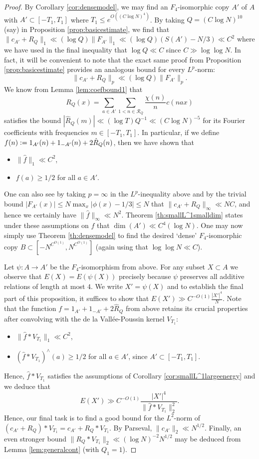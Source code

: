 \documentclass[11pt, reqno]{amsart}
\begin{document}
\begin{proof}
By Corollary \ref{cor:densemodel}, we may find an $F_4$-isomorphic copy $A'$ of $A$ with $A'\subset[-T_1,T_1]$ where $T_1\leqslant e^{O((C\log N)^4)}$. By taking $Q=(C\log N)^{10}$ (say) in Proposition \ref{prop:basicestimate}, we find that $\lVert c_{A'}+R_Q\rVert_1 \ll (\log Q)\lVert F_{A'}\rVert_1\ll (\log Q)(S(A')-N/3)\ll C^2$ where we have used in the final inequality that $\log Q\ll C$ since $C\gg \log \log N$. In fact, it will be convenient to note that the exact same proof from Proposition \ref{prop:basicestimate} provides an analogous bound for every $L^p$-norm:
$$\lVert c_{A'}+R_Q\rVert_p \ll (\log Q)\lVert F_{A'}\rVert_p.$$ We know from Lemma \ref{lem:coefbound1} that $$R_Q(x)=\sum_{a\in A'}\sum_{1<n\in \mathcal{R}_Q}\frac{\chi(n)}{n}c( nax)$$ satisfies the bound $|\hat{R}_Q(m)|\ll (\log T)Q^{-1}\ll (C\log N)^{-5}$ for its Fourier coefficients with frequencies $m\in [-T_1,T_1]$. In particular, if we define $f(n)\vcentcolon = 1_{A'}(n)+1_{-A'}(n)+2\hat{R}_Q(n)$, then we have shown that 
\begin{itemize}
    \item $\lVert \hat{f}\rVert_1 \ll C^2$,
    \item $f(a)\geqslant 1/2$ for all $a\in A'$. 
\end{itemize}
One can also see by taking $p=\infty$ in the $L^p$-inequality above and by the trivial bound $|F_{A'}(x)|\leqslant N\max_x |\phi(x)-1/3|\leqslant N$ that $\lVert c_{A'}+R_Q\rVert_\infty \ll N C$, and hence we certainly have $\lVert \hat{f}\rVert_\infty \ll N^2$. Theorem \ref{th:smallL^1smalldim} states under these assumptions on $f$ that $\dim(A')\ll C^4(\log N)$. One may now simply use Theorem \ref{th:densemodel} to find the desired `dense' $F_4$-isomorphic copy $B\subset [-N^{C^{O(1)}},N^{C^{O(1)}}]$ (again using that $\log \log N\ll C$).

\medskip

Let $\psi:A\to A'$ be the $F_4$-isomorphism from above. For any subset $X\subset A$ we observe that $E(X)=E(\psi(X))$ precisely because $\psi$ preserves all additive relations of length at most $4$. We write $X'=\psi(X)$ and to establish the final part of this proposition, it suffices to show that $E(X')\gg C^{-O(1)}\frac{|X'|^4}{N}$. Note that the function $f=1_{A'}+1_{-A'}+2\hat{R}_Q$ from above retains its crucial properties after convolving with the de la Vall\'ee-Poussin kernel $V_{T_1}$:
\begin{itemize}
    \item $\lVert \hat{f}*V_{T_1}\rVert_1\ll C^2$,
    \item $(\hat{f}*V_{T_1})^\wedge(a)\geqslant 1/2$ for all $a\in A'$, since $A'\subset[-T_1,T_1]$.
\end{itemize}
Hence, $\hat{f}*V_{T_1}$ satisfies the assumptions of Corollary \ref{cor:smallL^1largeenergy} and we deduce that $$E(X')\gg C^{-O(1)}\frac{|X'|^4}{\lVert \hat{f}*V_{T_1}\rVert_2^2}.$$ Hence, our final task is to find a good bound for the $L^2$-norm of $(c_{A'}+R_Q)*V_{T_1}=c_{A'}+R_Q*V_{T_1}$. By Parseval, $\lVert c_{A'}\rVert_2\ll N^{1/2}$. Finally, an even stronger bound $\lVert R_Q*V_{T_1}\rVert_2\ll (\log N)^{-2}N^{1/2}$ may be deduced from Lemma \ref{lem:generalcont} (with $Q_1=1$).
\end{proof}
\end{document}
